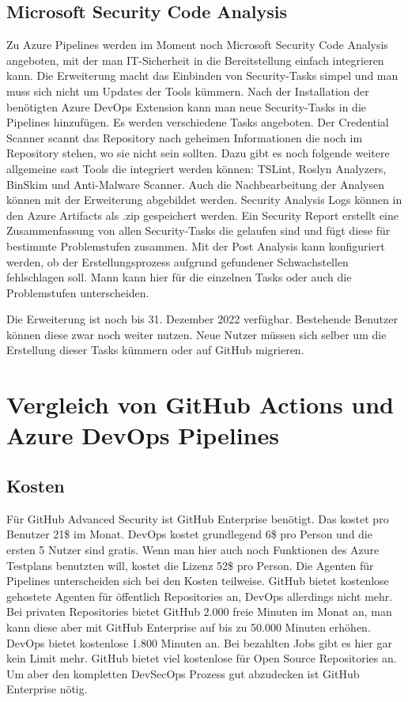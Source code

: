 \section{Microsoft Security Code Analysis}
Zu Azure Pipelines werden im Moment noch Microsoft Security Code Analysis angeboten, mit der man IT-Sicherheit in die Bereitstellung einfach integrieren kann.
Die Erweiterung macht das Einbinden von Security-Tasks simpel und man muss sich nicht um Updates der Tools kümmern. Nach der Installation der benötigten Azure DevOps Extension kann man neue Security-Tasks in die Pipelines hinzufügen. \cite{mic-msca-install}
Es werden verschiedene Tasks angeboten. Der Credential Scanner scannt das Repository nach geheimen Informationen die noch im Repository stehen, wo sie nicht sein sollten. Dazu gibt es noch folgende weitere allgemeine \ac{sast} Tools die integriert werden können: TSLint, Roslyn Analyzers, BinSkim und Anti-Malware Scanner.
Auch die Nachbearbeitung der Analysen können mit der Erweiterung abgebildet werden. Security Analysis Logs können in den Azure Artifacts als .zip gespeichert werden. Ein Security Report erstellt eine Zusammenfassung von allen Security-Tasks die gelaufen sind und fügt diese für bestimmte Problemstufen zusammen. Mit der Post Analysis kann konfiguriert werden, ob der Erstellungsprozess aufgrund gefundener Schwachstellen fehlschlagen soll. Mann kann hier für die einzelnen Tasks oder auch die Problemstufen unterscheiden. \cite{mic-msca-generall}

Die Erweiterung ist noch bis 31. Dezember 2022 verfügbar. Bestehende Benutzer können diese zwar noch weiter nutzen. Neue Nutzer müssen sich selber um die Erstellung dieser Tasks kümmern oder auf GitHub migrieren. \cite{mic-msca-generall}

\chapter{Vergleich von GitHub Actions und Azure DevOps Pipelines}

\section{Kosten}
Für GitHub Advanced Security ist GitHub Enterprise benötigt. Das kostet pro Benutzer 21\$ im Monat. DevOps kostet grundlegend 6\$ pro Person und die ersten 5 Nutzer sind gratis. Wenn man hier auch noch Funktionen des Azure Testplans benutzten will, kostet die Lizenz 52\$ pro Person.
Die Agenten für Pipelines unterscheiden sich bei den Kosten teilweise. GitHub bietet kostenlose gehostete Agenten für öffentlich Repositories an, DevOps allerdings nicht mehr. Bei privaten Repositories bietet GitHub 2.000 freie Minuten im Monat an, man kann diese aber mit GitHub Enterprise auf bis zu 50.000 Minuten erhöhen. DevOps bietet kostenlose 1.800 Minuten an. Bei bezahlten Jobs gibt es hier gar kein Limit mehr. 
GitHub bietet viel kostenlose für Open Source Repositories an. Um aber den kompletten DevSecOps Prozess gut abzudecken ist GitHub Enterprise nötig. \cite{mic-compare-github}

